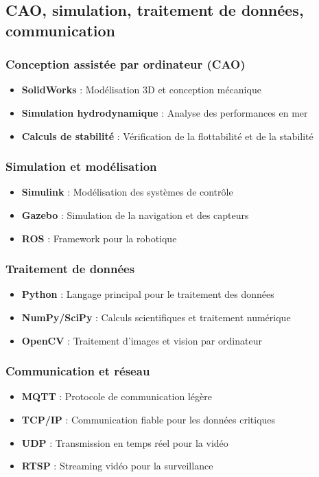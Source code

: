 {\subsection{CAO, simulation, traitement de données, communication}
\subsubsection{Conception assistée par ordinateur (CAO)}
\begin{itemize}
    \item \textbf{SolidWorks} : Modélisation 3D et conception mécanique
    \item \textbf{Simulation hydrodynamique} : Analyse des performances en mer
    \item \textbf{Calculs de stabilité} : Vérification de la flottabilité et de la stabilité
\end{itemize}

\subsubsection{Simulation et modélisation}
\begin{itemize}
    \item \textbf{Simulink} : Modélisation des systèmes de contrôle
    \item \textbf{Gazebo} : Simulation de la navigation et des capteurs
    \item \textbf{ROS} : Framework pour la robotique
\end{itemize}

\subsubsection{Traitement de données}
\begin{itemize}
    \item \textbf{Python} : Langage principal pour le traitement des données
    \item \textbf{NumPy/SciPy} : Calculs scientifiques et traitement numérique
    \item \textbf{OpenCV} : Traitement d'images et vision par ordinateur
\end{itemize}

\subsubsection{Communication et réseau}
\begin{itemize}
    \item \textbf{MQTT} : Protocole de communication légère
    \item \textbf{TCP/IP} : Communication fiable pour les données critiques
    \item \textbf{UDP} : Transmission en temps réel pour la vidéo
    \item \textbf{RTSP} : Streaming vidéo pour la surveillance
\end{itemize}

}
